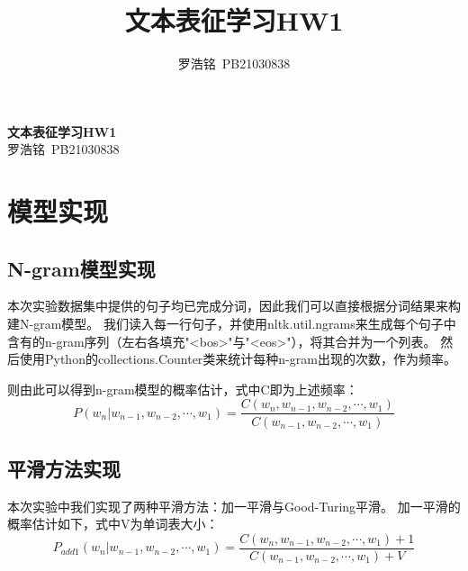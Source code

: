 \documentclass[twoside,11pt]{article}
\title{文本表征学习HW1}
\author{罗浩铭\ PB21030838}
\begin{document}
\fancyhf{} %
\fancyfoot[C]{\thepage} %

\renewcommand{\headrulewidth}{0pt} %

\begin{center}
  \textbf{\LARGE{文本表征学习HW1}}\\
  \vspace{0.1cm}
  \large{罗浩铭\ PB21030838}
\end{center}






\section{模型实现}
\subsection{N-gram模型实现}
本次实验数据集中提供的句子均已完成分词，因此我们可以直接根据分词结果来构建N-gram模型。
我们读入每一行句子，并使用nltk.util.ngrams来生成每个句子中含有的n-gram序列（左右各填充"<bos>"与"<eos>"），将其合并为一个列表。
然后使用Python的collections.Counter类来统计每种n-gram出现的次数，作为频率。

则由此可以得到n-gram模型的概率估计，式中C即为上述频率：
\begin{equation}
  P(w_n|w_{n-1},w_{n-2},\cdots,w_1) = \frac{C(w_n,w_{n-1},w_{n-2},\cdots,w_1)}{C(w_{n-1},w_{n-2},\cdots,w_1)}
\end{equation}

\subsection{平滑方法实现}
本次实验中我们实现了两种平滑方法：加一平滑与Good-Turing平滑。
加一平滑的概率估计如下，式中V为单词表大小：
\begin{equation}
  P_{add1}(w_n|w_{n-1},w_{n-2},\cdots,w_1) = \frac{C(w_n,w_{n-1},w_{n-2},\cdots,w_1)+1}{C(w_{n-1},w_{n-2},\cdots,w_1)+V}
\end{equation}
\end{document}
